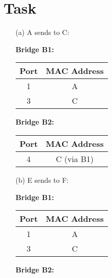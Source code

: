 \documentclass[11pt]{article}
\begin{document}
    \section{Task}\label{sec:task-3}
    \begin{itemize}
        \item[(a)] A sends to C:

        \begin{table}[ht]
            \centering
            \begin{minipage}{.4\textwidth}
                \centering
                \textbf{Bridge B1:}

                \begin{tabular}{|c|c|}
                    \hline
                    Port & MAC Address \\
                    \hline
                    1    & A           \\
                    3    & C           \\
                    \hline
                \end{tabular}
            \end{minipage}
            \begin{minipage}{.4\textwidth}
                \centering
                \textbf{Bridge B2:}

                \begin{tabular}{|c|c|}
                    \hline
                    Port & MAC Address \\
                    \hline
                    4    & C (via B1)  \\
                    \hline
                \end{tabular}
            \end{minipage}\label{tab:table-a}
        \end{table}



        \item[(b)] E sends to F:
            \begin{table}[ht]
            \centering
            \begin{minipage}{.4\textwidth}
                \centering
                \textbf{Bridge B1:}

                \begin{tabular}{|c|c|}
                    \hline
                    Port & MAC Address \\
                    \hline
                    1    & A           \\
                    3    & C           \\
                    \hline
                \end{tabular}
            \end{minipage}
            \begin{minipage}{.4\textwidth}
                \centering
                \textbf{Bridge B2:}


\end{minipage}
\end{table}
\end{itemize}
\end{document}
